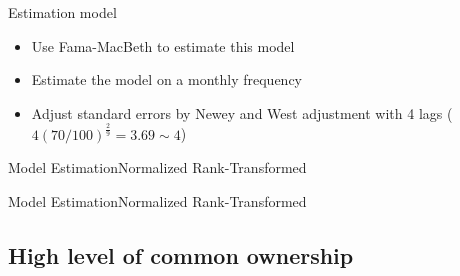 \documentclass{beamer}
\begin{document}
	
	
	\begin{frame}{Estimation model}
		\begin{itemize}
			\item Use Fama-MacBeth to estimate this model
			
			
			\item Estimate the model on a monthly frequency 
			\item Adjust standard errors by Newey and West adjustment with 4 lags ($ 4(70/100)^{\frac{2}{9}} = 3.69 \sim 4 $)
		\end{itemize}
	\end{frame}
	
	\begin{frame}{Model Estimation}{Normalized Rank-Transformed}
			\label{mresult2part1} 
			\begin{table}[htbp]
				\centering
				\resizebox{1\textwidth}{!}{
					
				}
			\end{table}
			
			
		\end{frame}
	\begin{frame}{Model Estimation}{Normalized Rank-Transformed}
			\label{mresult2part2} 
			\begin{table}[htbp]
				\centering
				\resizebox{1\textwidth}{!}{
					
				}
			\end{table}
			
			
		\end{frame}
	
	
	\subsection{High level of common ownership}
	
\end{document}
